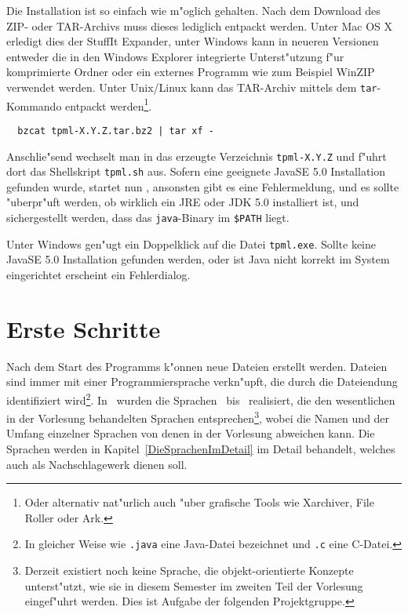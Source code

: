 Die Installation ist so einfach wie m"oglich gehalten. Nach dem Download des ZIP- oder TAR-Archivs muss dieses
lediglich entpackt werden. Unter Mac OS X erledigt dies der StuffIt Expander, unter Windows kann in
neueren Versionen entweder die in den Windows Explorer integrierte Unterst"utzung f"ur komprimierte
Ordner oder ein externes Programm wie zum Beispiel WinZIP verwendet werden. Unter Unix/Linux kann
das TAR-Archiv mittels dem {\tt tar}-Kommando entpackt werden\footnote{Oder alternativ nat"urlich
auch "uber grafische Tools wie Xarchiver, File Roller oder Ark.}.
\begin{verbatim}
  bzcat tpml-X.Y.Z.tar.bz2 | tar xf -
\end{verbatim}
Anschlie"send wechselt man in das erzeugte Verzeichnis {\tt tpml-X.Y.Z} und f"uhrt dort das Shellskript
{\tt tpml.sh} aus. Sofern eine geeignete JavaSE 5.0 Installation gefunden wurde, startet nun \TPML,
ansonsten gibt es eine Fehlermeldung, und es sollte "uberpr"uft werden, ob wirklich ein JRE oder JDK
5.0 installiert ist, und sichergestellt werden, dass das {\tt java}-Binary im {\tt \$PATH} liegt.

Unter Windows gen"ugt ein Doppelklick auf die Datei {\tt tpml.exe}. Sollte keine JavaSE 5.0
Installation gefunden werden, oder ist Java nicht korrekt im System eingerichtet erscheint
ein Fehlerdialog.



\section{Erste Schritte}

Nach dem Start des Programms k"onnen neue Dateien erstellt werden. Dateien sind immer mit einer
Programmiersprache verkn"upft, die durch die Dateiendung identifiziert wird\footnote{In gleicher
Weise wie {\tt .java} eine Java-Datei bezeichnet und {\tt .c} eine C-Datei.}. In \TPML\ wurden
die Sprachen \LZERO\ bis \LFOUR\ realisiert, die den wesentlichen in der Vorlesung behandelten
Sprachen entsprechen\footnote{Derzeit existiert noch keine Sprache, die objekt-orientierte
Konzepte unterst"utzt, wie sie in diesem Semester im zweiten Teil der Vorlesung eingef"uhrt
werden. Dies ist Aufgabe der folgenden Projektgruppe.}, wobei die Namen und der Umfang
einzelner Sprachen von denen in der Vorlesung abweichen kann. Die Sprachen werden in
Kapitel~\ref{DieSprachenImDetail} im Detail behandelt, welches auch als Nachschlagewerk
dienen soll.

